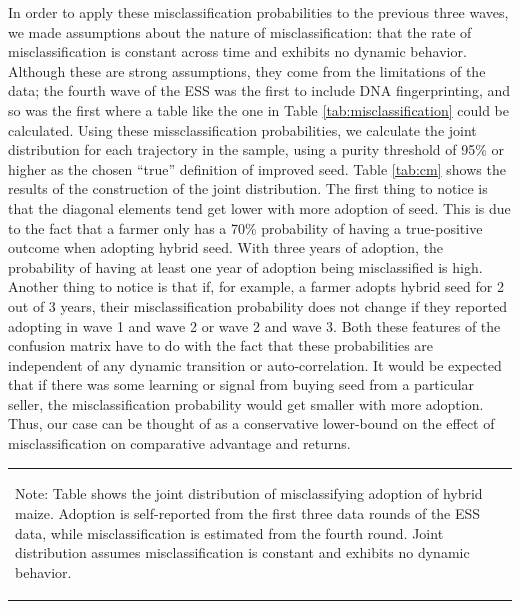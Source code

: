 \documentclass[11pt]{article}
\begin{document}
In order to apply these misclassification probabilities to the previous three waves, we made assumptions about the nature of misclassification: that the rate of misclassification is constant across time and exhibits no dynamic behavior. Although these are strong assumptions, they come from the limitations of the data; the fourth wave of the ESS was the first to include DNA fingerprinting, and so was the first where a table like the one in Table \ref{tab:misclassification} could be calculated. Using these missclassification probabilities, we calculate the joint distribution for each trajectory in the sample, using a purity threshold of 95\% or higher as the chosen ``true'' definition of improved seed. Table \ref{tab:cm} shows the results of the construction of the joint distribution. The first thing to notice is that the diagonal elements tend get lower with more adoption of seed. This is due to the fact that a farmer only has a 70\% probability of having a true-positive outcome when adopting hybrid seed. With three years of adoption, the probability of having at least one year of adoption being misclassified is high. Another thing to notice is that if, for example, a farmer adopts hybrid seed for 2 out of 3 years, their misclassification probability does not change if they reported adopting in wave 1 and wave 2 or wave 2 and wave 3. Both these features of the confusion matrix have to do with the fact that these probabilities are independent of any dynamic transition or auto-correlation. It would be expected that if there was some learning or signal from buying seed from a particular seller, the misclassification probability would get smaller with more adoption. Thus, our case can be thought of as a conservative lower-bound on the effect of misclassification on comparative advantage and returns.


\vspace*{-2em}
    \begin{table}[H]
        \centering
        \begin{tabular}{p{}} 
            \begin{tablenotes}
                  \small
                  \item Note: Table shows the joint distribution of misclassifying adoption of hybrid maize. Adoption is self-reported from the first three data rounds of the ESS data, while misclassification is estimated from the fourth round. Joint distribution assumes misclassification is constant and exhibits no dynamic behavior.
            \end{tablenotes}
        \end{tabular}
\end{table}  
\end{document}
